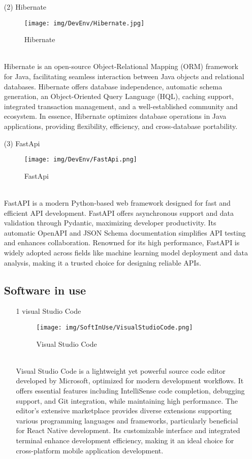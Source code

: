 \documentclass[conference]{IEEEtran}
\begin{document}
\begin{enumerate}
\begin{itemize}
\begin{itemize}
\item [(2)] Hibernate\cite{Hibernate}
\begin{figure}[h]
\centering
\texttt{[image: img/DevEnv/Hibernate.jpg]}
\caption{Hibernate} 
\end{figure}\\
Hibernate is an open-source Object-Relational Mapping (ORM) framework for Java, facilitating seamless interaction between Java objects and relational databases. Hibernate offers database independence, automatic schema generation, an Object-Oriented Query Language (HQL), caching support, integrated transaction management, and a well-established community and ecosystem. In essence, Hibernate optimizes database operations in Java applications, providing flexibility, efficiency, and cross-database portability.\\

\item [(3)] FastApi\cite{FastAPI}\\
\begin{figure}[h]
\centering
\texttt{[image: img/DevEnv/FastApi.png]}
\caption{FastApi} 
\end{figure} \\ 
FastAPI is a modern Python-based web framework designed for fast and efficient API development. FastAPI offers asynchronous support and data validation through Pydantic, maximizing developer productivity. Its automatic OpenAPI and JSON Schema documentation simplifies API testing and enhances collaboration. Renowned for its high performance, FastAPI is widely adopted across fields like machine learning model deployment and data analysis, making it a trusted choice for designing reliable APIs.\\

\subsection{Software in use}
\begin{enumerate}
\item[1] visual Studio Code
\begin{figure}[h]
\centering
\texttt{[image: img/SoftInUse/VisualStudioCode.png]}
\caption{Visual Studio Code} 
\end{figure}\\
Visual Studio Code is a lightweight yet powerful source code editor developed by Microsoft, optimized for modern development workflows. It offers essential features including IntelliSense code completion, debugging support, and Git integration, while maintaining high performance. The editor's extensive marketplace provides diverse extensions supporting various programming languages and frameworks, particularly beneficial for React Native development. Its customizable interface and integrated terminal enhance development efficiency, making it an ideal choice for cross-platform mobile application development.
\\


\end{enumerate}
\end{itemize}
\end{itemize}
\end{enumerate}
\end{document}
